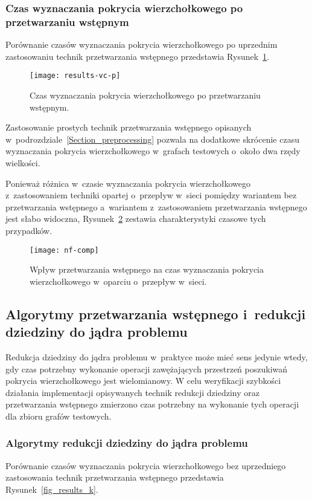 \subsubsection{\textbf{Czas wyznaczania pokrycia wierzchołkowego po przetwarzaniu wstępnym}}

  Porównanie czasów wyznaczania pokrycia wierzchołkowego po uprzednim zastosowaniu technik przetwarzania wstępnego przedstawia Rysunek~\ref{fig_results_vc_p}.
  \begin{figure}
    \caption{Czas wyznaczania pokrycia wierzchołkowego po przetwarzaniu wstępnym.}
    \label{fig_results_vc_p}
    \centering
      \texttt{[image: results-vc-p]}
  \end{figure}
  Zastosowanie prostych technik przetwarzania wstępnego opisanych w~podrozdziale~\ref{Section_preprocessing} pozwala na dodatkowe skrócenie czasu wyznaczania pokrycia wierzchołkowego w~grafach testowych o~około dwa rzędy wielkości.

  Ponieważ różnica w~czasie wyznaczania pokrycia wierzchołkowego z~zastosowaniem techniki opartej o~przepływ w~sieci pomiędzy wariantem bez przetwarzania wstępnego a~wariantem z~zastosowaniem przetwarzania wstępnego jest słabo widoczna, Rysunek~\ref{fig_nf_comp} zestawia charakterystyki czasowe tych przypadków.
  \begin{figure}
    \caption{Wpływ przetwarzania wstępnego na czas wyznaczania pokrycia wierzchołkowego w~oparciu o~przepływ w~sieci.}
    \label{fig_nf_comp}
    \centering
      \texttt{[image: nf-comp]}
  \end{figure}

\subsection{Algorytmy przetwarzania wstępnego i~redukcji dziedziny do jądra problemu}
  Redukcja dziedziny do jądra problemu w~praktyce może mieć sens jedynie wtedy, gdy czas potrzebny wykonanie operacji zawężających przestrzeń poszukiwań pokrycia wierzchołkowego jest wielomianowy.
  W celu weryfikacji szybkości działania implementacji opisywanych technik redukcji dziedziny oraz przetwarzania wstępnego zmierzono czas potrzebny na wykonanie tych operacji dla zbioru grafów testowych. 

\subsubsection{\textbf{Algorytmy redukcji dziedziny do jądra problemu}}
  Porównanie czasów wyznaczania pokrycia wierzchołkowego bez uprzedniego zastosowania technik przetwarzania wstępnego przedstawia Rysunek~\ref{fig_results_k}.

